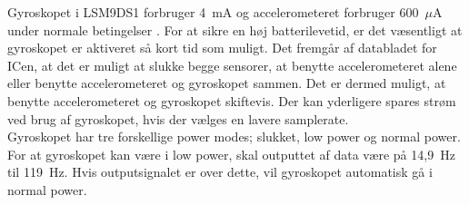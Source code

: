 Gyroskopet i LSM9DS1 forbruger 4~mA og accelerometeret forbruger 600~$\mu$A under normale betingelser \citep{Jimb02016}. For at sikre en høj batterilevetid, er det væsentligt at gyroskopet er aktiveret så kort tid som muligt. Det fremgår af databladet for ICen, at det er muligt at slukke begge sensorer, at benytte accelerometeret alene eller benytte accelerometeret og gyroskopet sammen. Det er dermed muligt, at benytte accelerometeret og gyroskopet skiftevis. Der kan yderligere spares strøm ved brug af gyroskopet, hvis der vælges en lavere samplerate.\\ %
Gyroskopet har tre forskellige power modes; slukket, low power og normal power. For at gyroskopet kan være i low power, skal outputtet af data være på 14,9~Hz til 119~Hz. Hvis outputsignalet er over dette, vil gyroskopet automatisk gå i normal power. %
